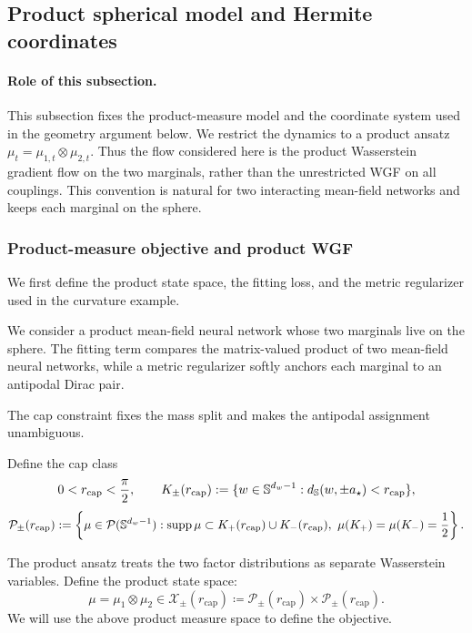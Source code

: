
\subsection{Product spherical model and Hermite coordinates}
\label{subsec:product-spherical-model}

\paragraph{Role of this subsection.}
This subsection fixes the product-measure model and the coordinate system used in the geometry argument below. We restrict the dynamics to a product ansatz
\(\mu_t=\mu_{1,t}\otimes\mu_{2,t}\). Thus the flow considered here is the product Wasserstein gradient flow on the two marginals, rather than the unrestricted WGF on all couplings. This convention is natural for two interacting mean-field networks and keeps each marginal on the sphere.

\subsubsection{Product-measure objective and product WGF}

We first define the product state space, the fitting loss, and the metric
regularizer used in the curvature example.

We consider a product mean-field neural network whose two marginals live on the sphere. The fitting term compares the matrix-valued product of two mean-field neural networks, while a metric regularizer softly anchors each marginal to an antipodal Dirac pair.

The cap constraint fixes the mass split and makes the antipodal assignment unambiguous.

Define the cap class
\begin{equation}
\label{eq:mf-spherical-caps}
0<r_{\mathrm{cap}}<\frac\pi2,
\qquad
K_\pm(r_{\mathrm{cap}})
:=
\{w\in\mathbb{S}^{d_w-1}: d_{\mathbb{S}}(w,\pm a_\star)<r_{\mathrm{cap}}\},
\end{equation}
\begin{equation}
\label{eq:mf-cap-class}
\mathcal P_\pm(r_{\mathrm{cap}})
:=
\left\{
\mu\in\mathcal P(\mathbb{S}^{d_w-1}):
\operatorname{supp}\mu\subset K_+(r_{\mathrm{cap}})\cup K_-(r_{\mathrm{cap}}),
\ \mu(K_+)=\mu(K_-)=\frac12
\right\}.
\end{equation}

The product ansatz treats the two factor distributions as separate Wasserstein
variables. Define the product state space:
\begin{equation}
\label{eq:mf-product-cap-class}
   \mu=\mu_1\otimes\mu_2\in  \mathcal X_\pm(r_{\mathrm{cap}})
\coloneq 
\mathcal P_\pm(r_{\mathrm{cap}})\times\mathcal P_\pm(r_{\mathrm{cap}}).
\end{equation}
We will use the above product measure space to define the objective.

